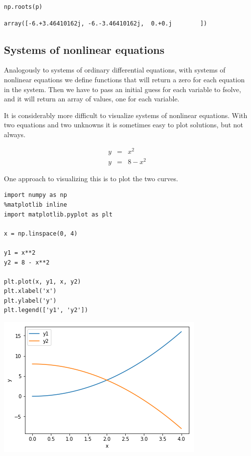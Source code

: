 \documentclass[11pt]{article}
\begin{document}
\begin{verbatim}
np.roots(p)
\end{verbatim}

\begin{verbatim}
array([-6.+3.46410162j, -6.-3.46410162j,  0.+0.j        ])
\end{verbatim}


\subsection{Systems of nonlinear equations}
\label{sec:orgfc4bb54}

Analogously to systems of ordinary differential equations, with systems of nonlinear equations we define functions that will return a zero for each equation in the system. Then we have to pass an initial guess for each variable to fsolve, and it will return an array of values, one for each variable.

It is considerably more difficult to visualize systems of nonlinear equations. With two equations and two unknowns it is sometimes easy to plot solutions, but not always.

\begin{align}
y &=& x^2 \\
y &=& 8 - x^2
\end{align}

One approach to visualizing this is to plot the two curves.

\begin{verbatim}
import numpy as np
%matplotlib inline
import matplotlib.pyplot as plt

x = np.linspace(0, 4)

y1 = x**2
y2 = 8 - x**2

plt.plot(x, y1, x, y2)
plt.xlabel('x')
plt.ylabel('y')
plt.legend(['y1', 'y2'])
\end{verbatim}

\begin{center}
\includegraphics[width=.9\linewidth]{obipy-resources/2cebf4017bd84c109f67e80d93d1304b-26729kvr.png}
\end{center}
\end{document}
